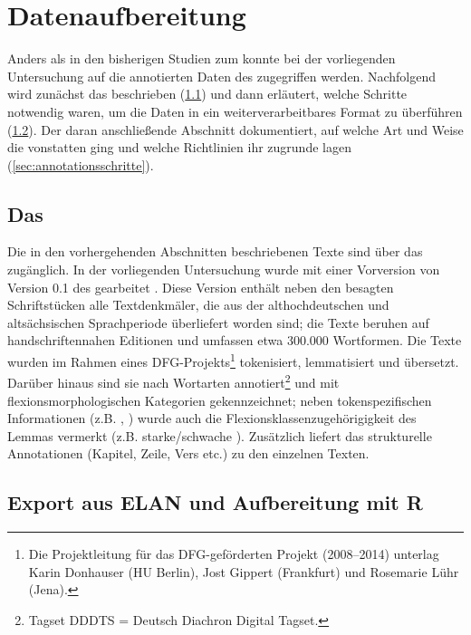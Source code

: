 \section{Datenaufbereitung} \label{sec:datenaufbereitung}

Anders als in den bisherigen Studien zum  konnte bei der vorliegenden Untersuchung auf die annotierten Daten des   zugegriffen werden. Nachfolgend wird zunächst das  beschrieben (\ref{sec:ddd}) und dann erläutert, welche Schritte notwendig waren, um die Daten in ein weiterverarbeitbares Format zu überführen (\ref{sec:aufbereitung}). Der daran anschließende Abschnitt dokumentiert, auf welche Art und Weise die  vonstatten ging und welche Richtlinien  ihr zugrunde lagen (\ref{sec:annotationsschritte}).

\subsection{Das } \label{sec:ddd}

Die in den vorhergehenden Abschnitten beschriebenen Texte sind über das   \parencite{Donhauser2015} zugänglich. In der vorliegenden Untersuchung wurde mit einer Vorversion von Version 0.1 des  gearbeitet \parencite{Donhauser2014}. Diese Version enthält neben den besagten Schriftstücken alle Textdenkmäler, die aus der althochdeutschen und altsächsischen Sprachperiode überliefert worden sind; die Texte beruhen auf handschriftennahen Editionen und umfassen etwa 300.000 Wortformen.
Die Texte wurden im Rahmen eines DFG-Projekts\footnote{Die Projektleitung für das DFG-geförderten Projekt (2008--2014) unterlag Karin Donhauser (HU Berlin), Jost Gippert (Frankfurt) und Rosemarie Lühr (Jena).} tokenisiert,  lemmatisiert und übersetzt. Darüber hinaus sind sie nach Wortarten  annotiert\footnote{Tagset DDDTS = Deutsch Diachron Digital Tagset.} und mit flexionsmorphologischen  Kategorien gekennzeichnet; neben  tokenspezifischen Informationen (z.B. , ) wurde auch die Flexionsklassenzugehörigigkeit  des Lemmas  vermerkt (z.B. starke/schwache ). Zusätzlich liefert das  strukturelle Annotationen  (Kapitel, Zeile, Vers etc.) zu den einzelnen Texten. 


\subsection{Export aus ELAN und Aufbereitung mit R}\label{sec:aufbereitung}

